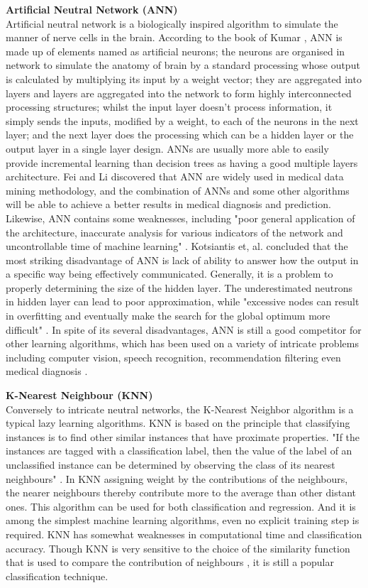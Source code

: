 \documentclass[10pt,journal,compsoc]{IEEEtran}
\begin{document}
\textbf{Artificial Neutral Network (ANN)\\}
Artificial neutral network is a biologically inspired algorithm to simulate the manner of nerve cells in the brain. According to the book of Kumar \cite{Kumar}, ANN is made up of elements named as artificial neurons; the neurons are organised in network to simulate the anatomy of brain by a standard processing whose output is calculated by multiplying its input by a weight vector; they are aggregated into layers and layers are aggregated into the network to form highly interconnected processing structures; whilst the input layer doesn't process information, it simply sends the inputs, modified by a weight, to each of the neurons in the next layer; and the next layer does the processing which can be a hidden layer or the output layer in a single layer design. ANNs are usually more able to easily provide incremental learning than decision trees as having a good multiple layers architecture. Fei and Li \cite{Fei} discovered that ANN are widely used in medical data mining methodology, and the combination of ANNs and some other algorithms will be able to achieve a better results in medical diagnosis and prediction. Likewise, ANN contains some weaknesses, including "poor general application of the architecture, inaccurate analysis for various indicators of the network and uncontrollable time of machine learning" \cite{Fei}. Kotsiantis et, al. \cite{Kotsiantis}concluded that the most striking disadvantage of ANN is lack of ability to answer how the output in a specific way being effectively communicated. Generally, it is a problem to properly determining the size of the hidden layer. The underestimated neutrons in hidden layer can lead to poor approximation, while "excessive nodes can result in overfitting and eventually make the search for the global optimum more difficult" \cite{Kotsiantis}. In spite of its several disadvantages,  ANN is still a good competitor for other learning algorithms, which has been used on a variety of intricate problems including computer vision, speech recognition, recommendation filtering even medical diagnosis \cite{Somvanshi}\cite{Kumar}.

\textbf{K-Nearest Neighbour (KNN)\\}
Conversely to intricate neutral networks, the K-Nearest Neighbor algorithm is a typical lazy learning algorithms. KNN is based on the principle that classifying instances is to find other similar instances that have proximate properties. "If the instances are tagged with a classification label, then the value of the label of an unclassified instance can be determined by observing the class of its nearest neighbours" \cite{Kotsiantis}.  In KNN assigning weight by the contributions of the neighbours, the nearer neighbours thereby contribute more to the average than other distant ones. This algorithm can be used for both classification and regression. And it is among the simplest machine learning algorithms, even no explicit training step is required. KNN has somewhat weaknesses in computational time and classification accuracy. Though KNN is very sensitive to the choice of the similarity function that is used to compare the contribution of neighbours \cite{Kotsiantis}, it is still a popular classification technique.
\end{document}
